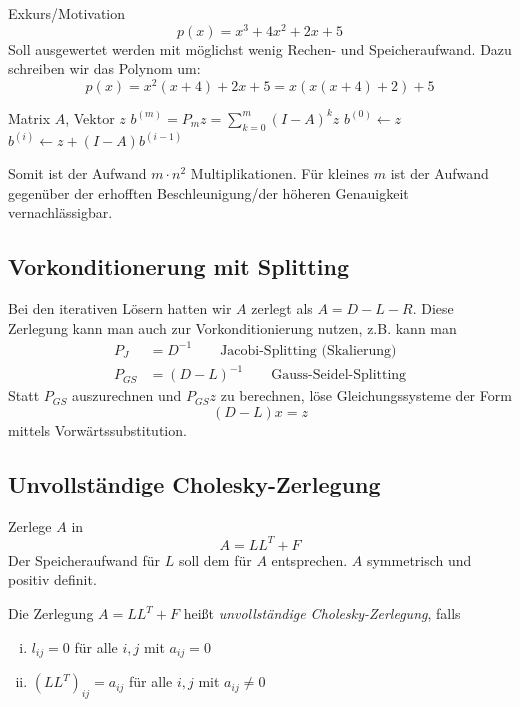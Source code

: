 \documentclass[a4paper]{scrartcl}
\numberwithin{equation}{section}
\begin{document}
\begin{seg}{Exkurs/Motivation}
	\[
		p(x) = x^3 + 4x^2 + 2x + 5
	\]
	Soll ausgewertet werden mit möglichst wenig Rechen- und Speicheraufwand.
	Dazu schreiben wir das Polynom um:
	\[
		p(x) = x^2(x+4) + 2x + 5 = x(x(x+4)+2)+5
	\]

	\begin{alg}
		\label{alg:6.5}
		\begin{algorithmic}
			\Input Matrix $A$, Vektor $z$
			\Output $b^{(m)} = P_mz = \sum_{k=0}^m (I-A)^kz$
			\Statex
			\State $b^{(0)} \gets z$
			\State $b^{(i)} \gets z + (I-A)b^{(i-1)}$
			\EndFor
		\end{algorithmic}
	\end{alg}
	Somit ist der Aufwand $m\cdot n^2$ Multiplikationen.
	Für kleines $m$ ist der Aufwand gegenüber der erhofften Beschleunigung/der höheren Genauigkeit vernachlässigbar.
\end{seg}


\subsection{Vorkonditionerung mit Splitting}


Bei den iterativen Lösern hatten wir $A$ zerlegt als $A=D-L-R$.
Diese Zerlegung kann man auch zur Vorkonditionierung nutzen, z.B. kann man 
\begin{align*}
	P_J &= D^{-1} \qquad \text{Jacobi-Splitting (Skalierung)}\\
	P_{GS} &= (D-L)^{-1} \qquad \text{Gauss-Seidel-Splitting}
\end{align*}
Statt $P_{GS}$ auszurechnen und $P_{GS}z$ zu berechnen, löse Gleichungssysteme der Form
\[
	(D-L)x = z
\]
mittels Vorwärtssubstitution.


\subsection{Unvollständige Cholesky-Zerlegung}


Zerlege $A$ in
\[
	A=LL^T + F
\]
Der Speicheraufwand für $L$ soll dem für $A$ entsprechen.
$A$ symmetrisch und positiv definit.

Die Zerlegung $A=LL^T + F$ heißt \emph{unvollständige Cholesky-Zerlegung}, falls
\begin{enumerate}[(i)]
	\item
		$l_{ij} = 0$ für alle $i,j$ mit $a_{ij}=0$
	\item
		$(LL^T)_{ij} = a_{ij}$ für alle $i,j$ mit $a_{ij}\neq 0$
\end{enumerate}
\end{document}
